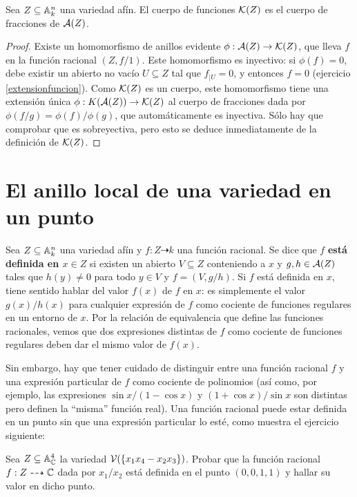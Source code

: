 \documentclass[ACGA.tex]{subfiles}
\begin{document}
\begin{prop}
 Sea $Z\subseteq \mathbb{A}^n_k$ una variedad afín. El cuerpo de funciones ${\mathcal K}(Z)$ es el cuerpo de fracciones de $\mathcal{A}(Z)$.
\end{prop}

\begin{proof}
 Existe un homomorfismo de anillos evidente $\phi:\mathcal{A}(Z)\to{\mathcal K}(Z)$, que lleva $f$ en la función racional $(Z,f/1)$. Este homomorfismo es inyectivo: si $\phi(f)=0$, debe existir un abierto no vacío $U\subseteq Z$ tal que $f_{|U}=0$, y entonces $f=0$ (ejercicio \ref{extensionfuncion}). Como ${\mathcal K}(Z)$ es un cuerpo, este homomorfismo tiene una extensión única $\phi:K(\mathcal{A}(Z))\to{\mathcal K}(Z)$ al cuerpo de fracciones dada por $\phi(f/g)=\phi(f)/\phi(g)$, que automáticamente es inyectiva. Sólo hay que comprobar que es sobreyectiva, pero esto se deduce inmediatamente de la definición de ${\mathcal K}(Z)$.
\end{proof}



\section{El anillo local de una variedad en un punto}

Sea $Z\subseteq\mathbb{A}^n_k$ una variedad afín y $f:Z\dashrightarrow k$ una función racional. Se dice que $f$ {\bf está definida en $x\in Z$} si existen un abierto $V\subseteq Z$ conteniendo a $x$ y $g,h\in \mathcal{A}(Z)$ tales que $h(y)\neq 0$ para todo $y\in V$ y $f=(V,g/h)$. Si $f$ está definida en $x$, tiene sentido hablar del valor $f(x)$ de $f$ en $x$: es simplemente el valor $g(x)/h(x)$ para cualquier expresión de $f$ como cociente de funciones regulares en un entorno de $x$. Por la relación de equivalencia que define las funciones racionales, vemos que dos expresiones distintas de $f$ como cociente de funciones regulares deben dar el mismo valor de $f(x)$.

Sin embargo, hay que tener cuidado de distinguir entre una función racional $f$ y una expresión particular de $f$ como cociente de polinomios (así como, por ejemplo, las expresiones $\sin x /(1-\cos x)$ y $(1+\cos x)/\sin x$ son distintas pero definen la ``misma'' función real). Una función racional puede estar definida en un punto sin que una expresión particular lo esté, como muestra el ejercicio siguiente:

\begin{ejer}
 Sea $Z\subseteq \mathbb{A}^4_{\mathbb{C}}$ la variedad $\mathcal{V}(\{x_1x_4-x_2x_3\})$. Probar que la función racional $f:Z\dashrightarrow \mathbb{C}$ dada por $x_1/x_2$ está definida en el punto $(0,0,1,1)$ y hallar su valor en dicho punto.
\end{ejer}
\end{document}
